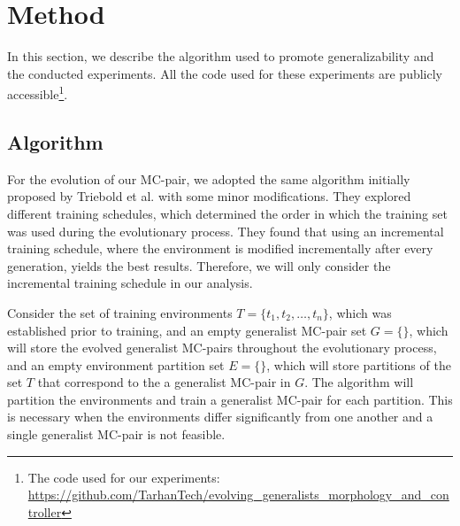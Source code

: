 
\section{Method}
    In this section, we describe the algorithm used to promote generalizability and the conducted experiments. All the code used for these experiments are publicly accessible\footnote{The code used for our experiments: \url{https://github.com/TarhanTech/evolving_generalists_morphology_and_controller}}.
    
    \subsection{Algorithm}
        
        For the evolution of our MC-pair, we adopted the same algorithm initially proposed by Triebold et al. \cite{Corinna_Triebold} with some minor modifications. They explored different training schedules, which determined the order in which the training set was used during the evolutionary process. They found that using an incremental training schedule, where the environment is modified incrementally after every generation, yields the best results. Therefore, we will only consider the incremental training schedule in our analysis.
        
        Consider the set of training environments $T = \{t_1, t_2, \ldots, t_n\}$, which was established prior to training, and an empty generalist MC-pair set $G = \{\}$, which will store the evolved generalist MC-pairs throughout the evolutionary process, and an empty environment partition set $E = \{\}$, which will store partitions of the set $T$ that correspond to the a generalist MC-pair in $G$. The algorithm will partition the environments and train a generalist MC-pair for each partition. This is necessary when the environments differ significantly from one another and a single generalist MC-pair is not feasible. 

